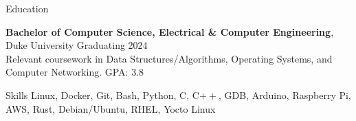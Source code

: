 \documentclass{resume}
\begin{document}






\begin{rSection}{Education}

\textbf{Bachelor of Computer Science, Electrical \& Computer Engineering}, Duke University \hfill {Graduating 2024}\\
Relevant coursework in Data Structures/Algorithms, Operating Systems, and Computer Networking. \hfill {GPA: 3.8}


\end{rSection}

\begin{rSection}{Skills}
    Linux, Docker, Git, Bash, Python, C, C$++$, GDB, Arduino, Raspberry Pi, AWS, Rust, Debian/Ubuntu, RHEL, Yocto Linux
\end{rSection}

\end{document}
